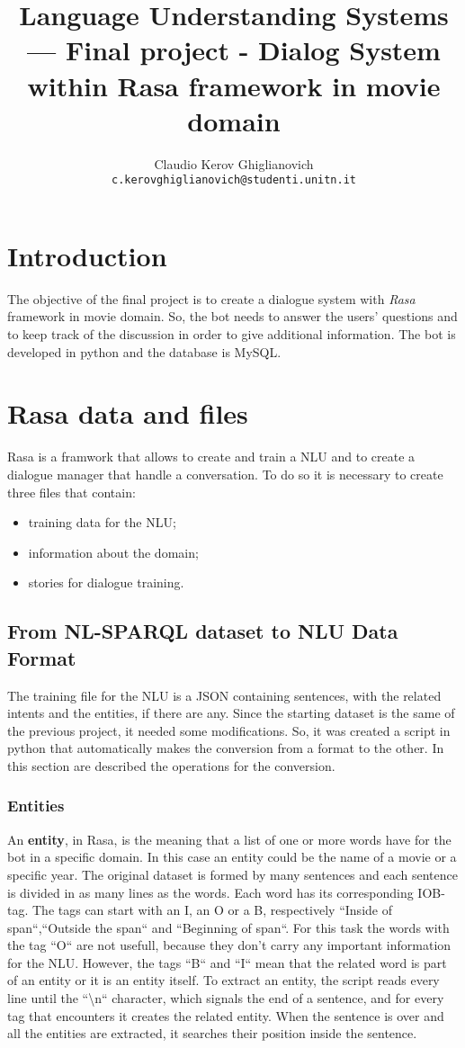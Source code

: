 \documentclass[11pt,a4paper]{article}
\title{Language Understanding Systems --- Final project - 
Dialog System within Rasa framework in movie domain}
\author{Claudio Kerov Ghiglianovich \\
  {\tt c.kerovghiglianovich@studenti.unitn.it}}
\date{}
\begin{document}
\maketitle


\section{Introduction}
\qquad The objective of the final project is to create a dialogue system with \textit{Rasa} framework in movie domain. So, the bot needs to answer the users' questions and to keep track of the discussion in order to give additional information. The bot is developed in python and the database is MySQL.

\section{Rasa data and files}
\qquad Rasa is a framwork that allows to create and train a NLU and to create a dialogue manager that handle a conversation. To do so it is necessary to create three files that contain:
\begin{itemize}
	\item training data for the NLU;
	\item information about the domain;
	\item stories for dialogue training.
\end{itemize}
\subsection{From NL-SPARQL dataset to NLU Data Format}
\qquad The training file for the NLU is a JSON containing sentences, with the related intents and the entities, if there are any. Since the starting dataset is the same of the previous project, it needed some modifications. So, it was created a script in python that automatically makes the conversion from a format to the other. In this section are described the operations for the conversion.
\subsubsection{Entities}
\qquad An \textbf{entity}, in Rasa, is the meaning that a list of one or more words have for the bot in a specific domain. In this case an entity could be the name of a movie or a specific year. The original dataset is formed by many sentences and each sentence is divided in as many lines as the words. Each word has its corresponding IOB-tag. The tags can start with an I, an O or a B, respectively ``Inside of span``,``Outside the span`` and ``Beginning of span``. For this task the words with the tag ``O`` are not usefull, because they don't carry any important information for the NLU. However, the tags ``B`` and ``I`` mean that the related word is part of an entity or it is an entity itself. To extract an entity, the script reads every line until the ``\textbackslash n`` character, which signals the end of a sentence, and for every tag that encounters it creates the related entity. When the sentence is over and all the entities are extracted, it searches their position inside the sentence.
\end{document}
